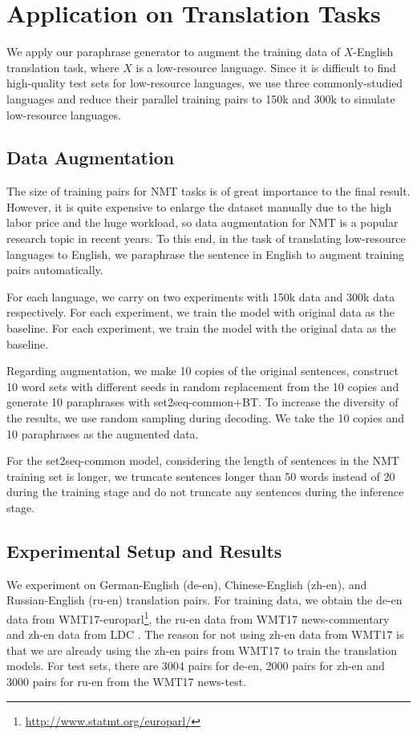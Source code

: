 \section{Application on Translation Tasks} \label{sec:app}
We apply our paraphrase generator to augment the training data of $X$-English 
translation task, where $X$ is a low-resource language. 
Since it is difficult to find high-quality test sets for low-resource 
languages, we use three commonly-studied languages and reduce their 
parallel training pairs to 150k and 300k to simulate low-resource languages. 

\subsection{Data Augmentation}
The size of training pairs for NMT tasks is of great importance to the final result. However, it is quite expensive to enlarge the dataset manually due to the high labor price and the huge workload, so data augmentation for NMT is a popular research topic in recent years. To this end, in the task of translating low-resource languages to English, we paraphrase the sentence in English to augment training pairs automatically.

For each language, we carry on two experiments with 150k data and 300k data respectively. For each experiment, we train the model with original data 
as the baseline. 
For each experiment, we train the model with the original
data as the baseline.

Regarding augmentation, we make 10 copies of the original sentences, 
construct 10 word sets with different seeds in random replacement from the 10 copies and generate 10 paraphrases 
with set2seq-common+BT.
To increase the diversity of the results, 
we use random sampling \cite{edunov2018understanding} during decoding. 
We take the 10 copies and 10 paraphrases as the augmented data.

For the set2seq-common model, considering the length of sentences 
in the NMT training set is longer, we truncate sentences longer 
than 50 words instead of 20 during the training stage and 
do not truncate any sentences during the inference stage.

\subsection{Experimental Setup and Results}
We experiment on German-English (de-en), Chinese-English (zh-en), and Russian-English (ru-en) translation pairs. For training data, we obtain the de-en data from WMT17-europarl\footnote{\url{http://www.statmt.org/europarl/}}\cite{koehn2005europarl}, the ru-en data from WMT17 news-commentary and zh-en data from LDC \cite{liberman2002emotional,huang2002multiple}. The reason for not using zh-en data from WMT17 is that we are already using the zh-en pairs from WMT17 to train 
the translation models.
For test sets, there are 3004 pairs for de-en, 2000 pairs for zh-en and 
3000 pairs for ru-en from the WMT17 news-test.

